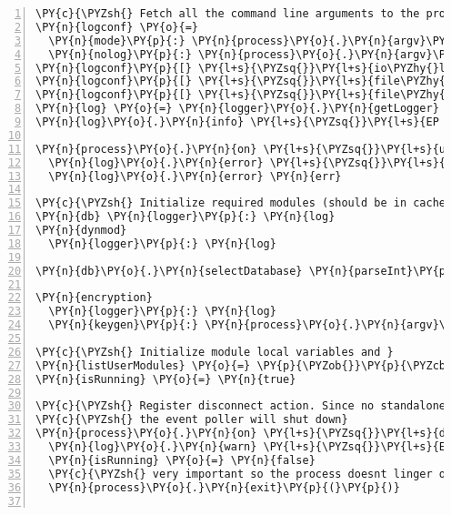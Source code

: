 \begin{Verbatim}[fontsize=\scriptsize,commandchars=\\\{\},numbers=left,firstnumber=1,stepnumber=1]
\PY{c}{\PYZsh{} Fetch all the command line arguments to the process to init the logger}
\PY{n}{logconf} \PY{o}{=}
  \PY{n}{mode}\PY{p}{:} \PY{n}{process}\PY{o}{.}\PY{n}{argv}\PY{p}{[} \PY{l+m+mi}{2} \PY{p}{]}
  \PY{n}{nolog}\PY{p}{:} \PY{n}{process}\PY{o}{.}\PY{n}{argv}\PY{p}{[} \PY{l+m+mi}{6} \PY{p}{]}
\PY{n}{logconf}\PY{p}{[} \PY{l+s}{\PYZsq{}}\PY{l+s}{io\PYZhy{}level}\PY{l+s}{\PYZsq{}} \PY{p}{]} \PY{o}{=} \PY{n}{process}\PY{o}{.}\PY{n}{argv}\PY{p}{[} \PY{l+m+mi}{3} \PY{p}{]}
\PY{n}{logconf}\PY{p}{[} \PY{l+s}{\PYZsq{}}\PY{l+s}{file\PYZhy{}level}\PY{l+s}{\PYZsq{}} \PY{p}{]} \PY{o}{=} \PY{n}{process}\PY{o}{.}\PY{n}{argv}\PY{p}{[} \PY{l+m+mi}{4} \PY{p}{]}
\PY{n}{logconf}\PY{p}{[} \PY{l+s}{\PYZsq{}}\PY{l+s}{file\PYZhy{}path}\PY{l+s}{\PYZsq{}} \PY{p}{]} \PY{o}{=} \PY{n}{process}\PY{o}{.}\PY{n}{argv}\PY{p}{[} \PY{l+m+mi}{5} \PY{p}{]}
\PY{n}{log} \PY{o}{=} \PY{n}{logger}\PY{o}{.}\PY{n}{getLogger} \PY{n}{logconf}
\PY{n}{log}\PY{o}{.}\PY{n}{info} \PY{l+s}{\PYZsq{}}\PY{l+s}{EP | Event Poller starts up}\PY{l+s}{\PYZsq{}}

\PY{n}{process}\PY{o}{.}\PY{n}{on} \PY{l+s}{\PYZsq{}}\PY{l+s}{uncaughtException}\PY{l+s}{\PYZsq{}}\PY{p}{,} \PY{p}{(} \PY{n}{err} \PY{p}{)} \PY{o}{\PYZhy{}}\PY{o}{\PYZgt{}}
  \PY{n}{log}\PY{o}{.}\PY{n}{error} \PY{l+s}{\PYZsq{}}\PY{l+s}{Probably one of the event pollers produced an error!}\PY{l+s}{\PYZsq{}}
  \PY{n}{log}\PY{o}{.}\PY{n}{error} \PY{n}{err}

\PY{c}{\PYZsh{} Initialize required modules (should be in cache already)}
\PY{n}{db} \PY{n}{logger}\PY{p}{:} \PY{n}{log}
\PY{n}{dynmod}
  \PY{n}{logger}\PY{p}{:} \PY{n}{log}

\PY{n}{db}\PY{o}{.}\PY{n}{selectDatabase} \PY{n}{parseInt}\PY{p}{(} \PY{n}{process}\PY{o}{.}\PY{n}{argv}\PY{p}{[} \PY{l+m+mi}{7} \PY{p}{]} \PY{p}{)} \PY{o}{|}\PY{o}{|} \PY{l+m+mi}{0}
  
\PY{n}{encryption}
  \PY{n}{logger}\PY{p}{:} \PY{n}{log}
  \PY{n}{keygen}\PY{p}{:} \PY{n}{process}\PY{o}{.}\PY{n}{argv}\PY{p}{[} \PY{l+m+mi}{8} \PY{p}{]}

\PY{c}{\PYZsh{} Initialize module local variables and }
\PY{n}{listUserModules} \PY{o}{=} \PY{p}{\PYZob{}}\PY{p}{\PYZcb{}}
\PY{n}{isRunning} \PY{o}{=} \PY{n}{true}

\PY{c}{\PYZsh{} Register disconnect action. Since no standalone mode is intended}
\PY{c}{\PYZsh{} the event poller will shut down}
\PY{n}{process}\PY{o}{.}\PY{n}{on} \PY{l+s}{\PYZsq{}}\PY{l+s}{disconnect}\PY{l+s}{\PYZsq{}}\PY{p}{,} \PY{p}{(}\PY{p}{)} \PY{o}{\PYZhy{}}\PY{o}{\PYZgt{}}
  \PY{n}{log}\PY{o}{.}\PY{n}{warn} \PY{l+s}{\PYZsq{}}\PY{l+s}{EP | Shutting down Event Poller}\PY{l+s}{\PYZsq{}}
  \PY{n}{isRunning} \PY{o}{=} \PY{n}{false}
  \PY{c}{\PYZsh{} very important so the process doesnt linger on when the paren process is killed  }
  \PY{n}{process}\PY{o}{.}\PY{n}{exit}\PY{p}{(}\PY{p}{)}


\end{Verbatim}

